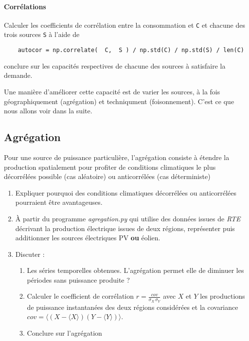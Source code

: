 \documentclass[12pt,french]{article}
\newcommand{\tmtextit}[1]{{\itshape{#1}}}
\begin{document}
\paragraph{Corrélations}  Calculer les coefficients de corrélation entre la consommation et \texttt{C} et chacune des trois sources \texttt{S} à l'aide de 
\begin{lstlisting}
	autocor = np.correlate(  C,  S ) / np.std(C) / np.std(S) / len(C)
\end{lstlisting}
conclure sur les capacités respectives de chacune des sources à satisfaire la demande.

Une manière d'améliorer cette capacité est de varier les sources, à la fois géographiquement (agrégation) et techniqument (foisonnement). C'est ce que nous allons voir dans la suite.


\subsection{Agrégation}

Pour une source de puissance particulière, l'agrégation consiste à étendre la production spatialement pour profiter de conditions climatiques le plus décorrélées possible (cas aléatoire) ou anticorrélées (cas déterministe)
\begin{enumerate}
	\item Expliquer pourquoi des conditions climatiques décorrélées ou anticorrélées pourraient être avantageuses.
	
  \item À partir du programme \tmtextit{agregation.py} qui utilise des  données issues de \tmtextit{RTE} décrivant la production électrique   issues de deux régions, représenter puis additionner les sources
  électriques PV \textbf{ou} éolien.
  
  \item Discuter :
  \begin{enumerate}
    \item Les séries temporelles obtenues. L'agrégation permet elle de diminuer les périodes sans puissance produite ?
        
    \item Calculer le coefficient de corrélation $r=\frac{cov}{\sigma_X \, \sigma_Y}$ avec $X$ et $Y$ les productions de puissance instantanées des deux régions considérées et la covariance $cov=\langle (X-\langle X \rangle)(Y-\langle Y \rangle) \rangle$.
    
    \item Conclure sur l'agrégation 
    
  \end{enumerate}
\end{enumerate}
\end{document}

